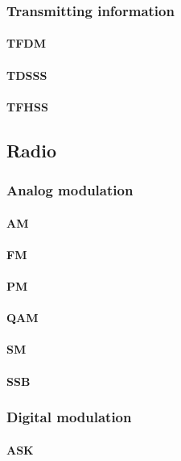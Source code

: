 \subsubsection{Transmitting information}
\paragraph{TFDM}
\paragraph{TDSSS}
\paragraph{TFHSS}


\subsection{Radio}

\subsubsection{Analog modulation}

\paragraph{AM}
\paragraph{FM}
\paragraph{PM}
\paragraph{QAM}
\paragraph{SM}
\paragraph{SSB}
         

\subsubsection{Digital modulation}

\paragraph{ASK}
